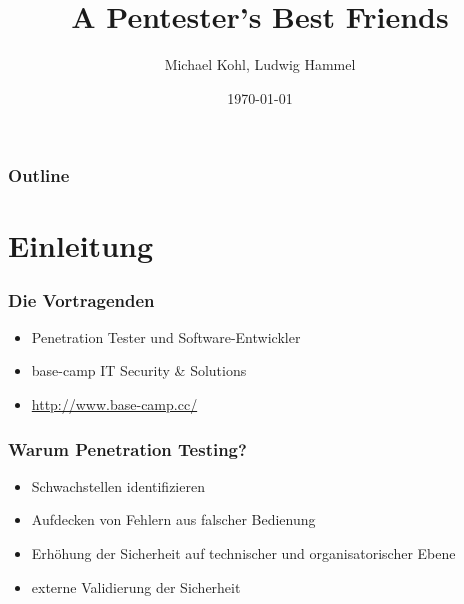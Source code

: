 \documentclass[11pt]{beamer}
\institute{Linuxwochen 2012}
\title{A Pentester's Best Friends}
\author{Michael Kohl, Ludwig Hammel}
\date{\today}
\begin{document}
\maketitle

\begin{frame}
\frametitle{Outline}
\setcounter{tocdepth}{3}
\tableofcontents
\end{frame}

\section{Einleitung}
\label{sec-1}
\begin{frame}[fragile]\frametitle{Die Vortragenden}
\label{sec-1-1}
\begin{itemize}

\item Penetration Tester und Software-Entwickler\\
\label{sec-1-1-1}%
\item base-camp IT Security \& Solutions\\
\label{sec-1-1-2}%
\item \href{http://www.base-camp.cc/}{http://www.base-camp.cc/}\\
\label{sec-1-1-3}%
\end{itemize} %
\end{frame}
\begin{frame}[fragile]\frametitle{Warum Penetration Testing?}
\label{sec-1-2}
\begin{itemize}

\item Schwachstellen identifizieren\\
\label{sec-1-2-1}%
\item Aufdecken von Fehlern aus falscher Bedienung\\
\label{sec-1-2-2}%
\item Erhöhung der Sicherheit auf technischer und organisatorischer Ebene\\
\label{sec-1-2-3}%
\item externe Validierung der Sicherheit\\
\label{sec-1-2-4}%
\end{itemize} %
\end{frame}
\end{document}
